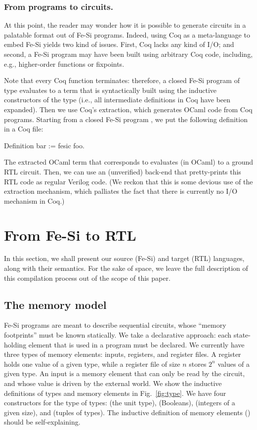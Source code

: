 \documentclass{llncs}
\begin{document}
\subsubsection{From programs to circuits.} At this point, the reader
may wonder how it is possible to generate circuits in a palatable
format out of Fe-Si programs. Indeed, using Coq as a meta-language to
embed Fe-Si yields two kind of issues. First, Coq lacks any kind of
I/O; and second, a Fe-Si program may have been built using arbitrary
Coq code, including, e.g., higher-order functions or fixpoints.

Note that every Coq function terminates: therefore, a closed Fe-Si
program of type  evaluates to a term that is
syntactically built using the inductive constructors of the type
 (i.e., all intermediate definitions in Coq have been expanded).
%
Then we use Coq's extraction, which generates OCaml code from Coq
programs.  
%
Starting from a closed Fe-Si program , we put the following
definition in a Coq file:
\begin{mcoq}
Definition bar := fesic foo.  
\end{mcoq}
The extracted OCaml term that corresponds to  evaluates (in OCaml) to a
ground RTL circuit. Then, we can use an (unverified) back-end that
pretty-prints this RTL code as regular Verilog code. 
%
(We reckon that this is some devious use of the extraction mechanism,
which palliates the fact that there is currently no I/O mechanism in
Coq.)

\section{From Fe-Si to RTL}

In this section, we shall present our source (Fe-Si) and target (RTL)
languages, along with their semantics. For the sake of space, we leave
the full description of this compilation process out of the scope of
this paper.

\subsection{The memory model}
Fe-Si programs are meant to describe sequential circuits, whose
``memory footprints'' must be known statically. We take a declarative
approach: each state-holding element that is used in a program must be
declared. 
%
We currently have three types of memory elements: inputs, registers,
and register files. A register holds one value of a given type, while a
register file of size $n$ stores $2^n$ values of a given type. 
%
An input is a memory element that can only be read by the circuit,
and whose value is driven by the external world.
%
We show the inductive definitions of types and memory elements in
Fig.~\ref{fig:type}. 
%
We have four constructors for the type  of types: 
(the unit type),  (Booleans),  (integers of a given
size), and  (tuples of types). The inductive definition of
memory elements () should be self-explaining. 
\end{document}
